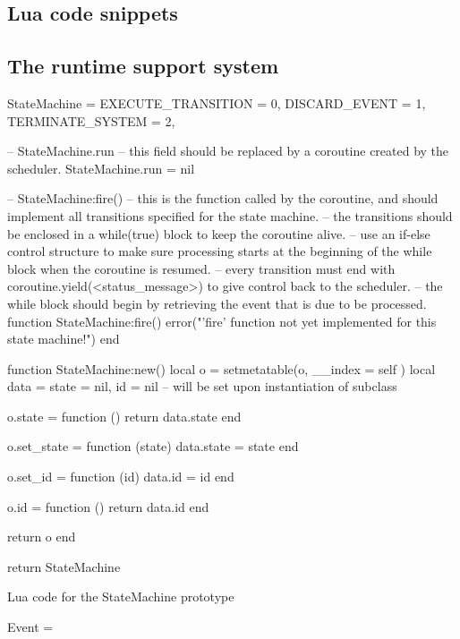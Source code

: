 \begin{appendices}

\chapter{Lua code snippets}
\label{app:code}

\section{The runtime support system}
\label{code:rts}

\begin{listing}[H]
\begin{luacode}
StateMachine = {
	EXECUTE_TRANSITION = 0,
	DISCARD_EVENT = 1,
	TERMINATE_SYSTEM = 2,
}

-- StateMachine.run
-- this field should be replaced by a coroutine created by the scheduler.
StateMachine.run = nil

-- StateMachine:fire()
-- this is the function called by the coroutine, and should implement all transitions specified for the state machine.
-- the transitions should be enclosed in a while(true) block to keep the coroutine alive.
-- use an if-else control structure to make sure processing starts at the beginning of the while block when the coroutine is resumed.
-- every transition must end with coroutine.yield(<status_message>) to give control back to the scheduler.
-- the while block should begin by retrieving the event that is due to be processed. 
function StateMachine:fire()
	error("'fire' function not yet implemented for this state machine!")
end

function StateMachine:new()
	local o = {}
	setmetatable(o, { __index = self })
	local data = {state = nil, id = nil} -- will be set upon instantiation of subclass
	
	o.state = function ()
		return data.state
	end
	
	o.set_state = function (state)
		data.state = state
	end
	
	o.set_id = function (id)
		data.id = id
	end
	
	o.id = function ()
		return data.id
	end
	
	return o
end

return StateMachine
\end{luacode}
	\caption{Lua code for the StateMachine prototype }
	\label{code:stm}
\end{listing}

\begin{listing}[H]
\begin{luacode}
Event = {}


\end{luacode}
\end{listing}
\end{appendices}
